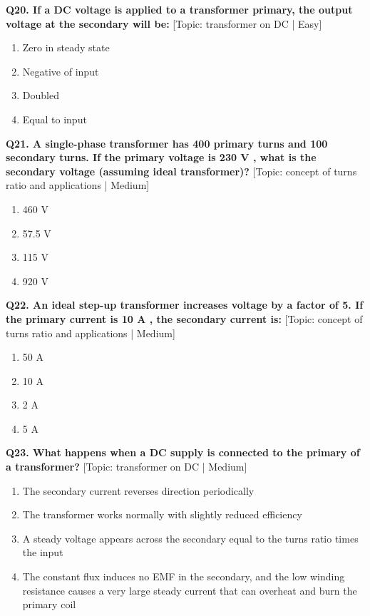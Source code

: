 \noindent\textbf{Q20. If a DC voltage is applied to a transformer primary, the output voltage at the secondary will be:} \hfill [Topic: transformer on DC | Easy]
\begin{enumerate}[label=(\alph*),topsep=2pt,itemsep=1pt,partopsep=0pt,parsep=0pt]
    \item {Zero in steady state}
    \item {Negative of input}
    \item {Doubled}
    \item {Equal to input}
\end{enumerate}
\vspace{2mm}

\noindent\textbf{Q21. A single-phase transformer has 400 primary turns and 100 secondary turns. If the primary voltage is 230 V , what is the secondary voltage (assuming ideal transformer)?} \hfill [Topic: concept of turns ratio and applications | Medium]
\begin{enumerate}[label=(\alph*),topsep=2pt,itemsep=1pt,partopsep=0pt,parsep=0pt]
    \item {460 V}
    \item {57.5 V}
    \item {115 V}
    \item {920 V}
\end{enumerate}
\vspace{2mm}

\noindent\textbf{Q22. An ideal step-up transformer increases voltage by a factor of 5. If the primary current is 10 A , the secondary current is:} \hfill [Topic: concept of turns ratio and applications | Medium]
\begin{enumerate}[label=(\alph*),topsep=2pt,itemsep=1pt,partopsep=0pt,parsep=0pt]
    \item {50 A}
    \item {10 A}
    \item {2 A}
    \item {5 A}
\end{enumerate}
\vspace{2mm}

\noindent\textbf{Q23. What happens when a DC supply is connected to the primary of a transformer?} \hfill [Topic: transformer on DC | Medium]
\begin{enumerate}[label=(\alph*),topsep=2pt,itemsep=1pt,partopsep=0pt,parsep=0pt]
    \item {The secondary current reverses direction periodically}
    \item {The transformer works normally with slightly reduced efficiency}
    \item {A steady voltage appears across the secondary equal to the turns ratio times the input}
    \item {The constant flux induces no EMF in the secondary, and the low winding resistance causes a very large steady current that can overheat and burn the primary coil}
\end{enumerate}
\vspace{2mm}

